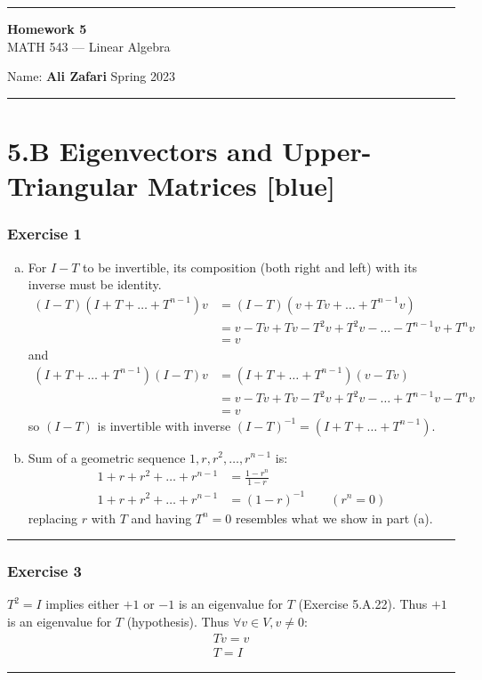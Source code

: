 \documentclass[12pt, letterpaper]{scrartcl}
\begin{document}
\begin{center}
    \hrule
    \vspace{0.4cm}
    { \textbf{{\large Homework 5}} \\ MATH 543 --- Linear Algebra}
\end{center}
{ Name: \textbf{Ali Zafari} \hspace{\fill} Spring 2023 } \newline\hrule

\section*{5.B Eigenvectors and Upper-Triangular Matrices \xrfill[2pt]{3pt}[blue]}
\subsubsection*{Exercise 1}
\begin{enumerate}[(a)]
    \item For $I-T$ to be invertible, its composition (both right and left) with its inverse must be identity.
     \begin{align*}
         (I-T)(I+T+\dots+T^{n-1})v&=(I-T)(v+Tv+\dots+T^{n-1}v)\\
         &=v-Tv+Tv-T^2v+T^2v-\dots-T^{n-1}v+T^nv\\
         &=v
     \end{align*}
     and
      \begin{align*}
         (I+T+\dots+T^{n-1})(I-T)v&=(I+T+\dots+T^{n-1})(v-Tv)\\
         &=v-Tv+Tv-T^2v+T^2v-\dots+T^{n-1}v-T^nv\\
         &=v
     \end{align*}
     so $(I-T)$ is invertible with inverse $(I-T)^{-1}=(I+T+\dots+T^{n-1})$.
     \item
     Sum of a geometric sequence $1,r,r^2,\dots,r^{n-1}$ is:
     \begin{align*}
         1+r+r^2+\dots+r^{n-1}&=\frac{1-r^n}{1-r}\\
         1+r+r^2+\dots+r^{n-1}&=(1-r)^{-1} \qquad (r^n=0)
     \end{align*}
     replacing $r$ with $T$ and having $T^n=0$ resembles what we show in part (a).
\end{enumerate}
 
\vskip1mm\hrule


\subsubsection*{Exercise 3}
$T^2=I$ implies either $+1$ or $-1$ is an eigenvalue for $T$ (Exercise 5.A.22). Thus $+1$ is an eigenvalue for $T$ (hypothesis). Thus $\forall v \in V, v\neq 0$:
\begin{align*}
    Tv = v\\
    T=I
\end{align*}
\vskip1mm\hrule
\end{document}
